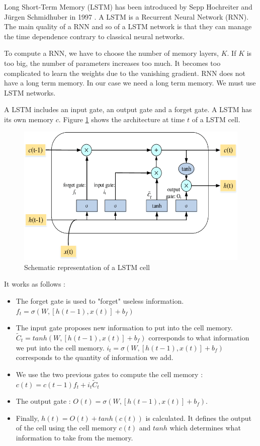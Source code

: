 Long Short-Term Memory (LSTM) has been introduced by Sepp Hochreiter and Jürgen Schmidhuber in 1997 \cite{lstm_createur}. A LSTM is a Recurrent Neural Network (RNN). The main quality of a RNN and so of a LSTM network is that they can manage the time dependence contrary to classical neural networks.

To compute a RNN, we have to choose the number of memory layers, $K$. If $K$ is too big, the number of parameters increases too much. It becomes too complicated to learn the weights due to the vanishing gradient. RNN does not have a long term memory. In our case we need a long term memory. We must use LSTM networks.\newline

A LSTM includes an input gate, an output gate and a forget gate. A LSTM has its own memory $c$. Figure \ref{fig:lstm cell} shows the architecture at time $t$ of a LSTM cell.

\begin{figure}[H]
    \centering
    \includegraphics[scale = 0.4]{Graph/cellule_lstm.png}
    \caption{Schematic representation of a LSTM cell \cite{lstm_cell}}
    \label{fig:lstm cell}
\end{figure}

It works as follows :
\begin{itemize}
    \item The forget gate is used to "forget" useless information. $f_t = \sigma(W, [h(t-1), x(t)] + b_f)$
    \item The input gate proposes new information to put into the cell memory. $\tilde{C}_t = tanh(W, [h(t-1), x(t)] + b_f)$ corresponds to what information we put into the cell memory. $i_t = \sigma(W, [h(t-1), x(t)] + b_f)$ corresponds to the quantity of information we add.
    \item We use the two previous gates to compute the cell memory : $c(t) = c(t-1) f_t + i_t \tilde{C}_t $
    \item The output gate : $O(t) = \sigma(W, [h(t-1), x(t)] + b_f)$.
    \item Finally, $h(t) = O(t) + tanh(c(t))$ is calculated. It defines the output of the cell using the cell memory $c(t)$ and $tanh$ which determines what information to take from the memory.
\end{itemize}


